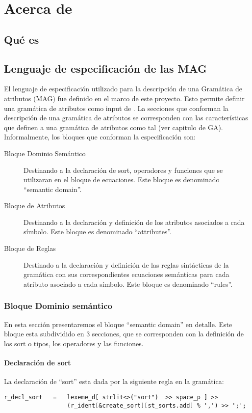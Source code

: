 \chapter{Acerca de \maggen}
\label{chap:disen_}
\minitoc


\section{Qu\'e es \maggen}

\section{Lenguaje de especificaci\'on de las MAG}

El lenguaje de especificación utilizado para la descripción de una Gramática de atributos (MAG) fue definido en el marco de este proyecto. Esto permite definir una gramática de atributos como input de \maggen. 
La secciones que conforman la descripción de una gramática de atributos se corresponden con las características que definen a una gramática de atributos como tal (ver capitulo de GA). 
Informalmente, los bloques que conforman la especificación son:
\begin{description}
\item [Bloque Dominio Semántico] Destinando a la declaración de sort, operadores y funciones que se utilizaran en el bloque de ecuaciones. Este bloque es denominado ``semantic domain''.
\item [Bloque de Atributos] Destinando a la declaración y definición de los atributos asociados a cada símbolo. Este bloque es denominado ``attributes''.
\item [Bloque de Reglas] Destinado a la declaración y definición de las reglas sintácticas de la gramática con sus correspondientes ecuaciones semánticas para cada atributo asociado a cada símbolo. Este bloque es denominado ``rules''.
\end{description}

\subsection{Bloque Dominio semántico}

En esta sección presentaremos el bloque ``semantic domain'' en detalle. Este bloque esta subdividido en 3 secciones, que se corresponden con la definición de los sort o tipos, los operadores y las funciones.
\subsubsection{Declaración de sort}
La declaración de ``sort'' esta dada por la siguiente regla en la gramática:
\begin{table}[!htb]
\lstset{language=C++}
\scriptsize
\begin{lstlisting}[frame=single]
r_decl_sort   =   lexeme_d[ strlit<>("sort")  >> space_p ] >>
                  (r_ident[&create_sort][st_sorts.add] % ',') >> ';';
\end{lstlisting}
\end{table}
